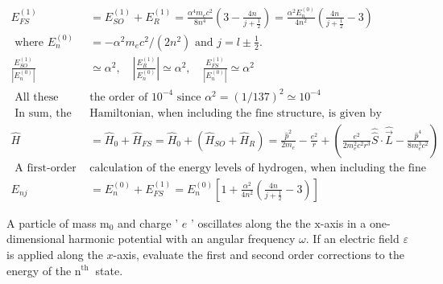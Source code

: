 	$$
	\begin{aligned}
	E_{F S}^{(1)}&=E_{S O}^{(1)}+E_{R}^{(1)}=\frac{\alpha^{4} m_{e} c^{2}}{8 n^{4}}\left(3-\frac{4 n}{j+\frac{1}{2}}\right)=\frac{\alpha^{2} E_{n}^{(0)}}{4 n^{2}}\left(\frac{4 n}{j+\frac{1}{2}}-3\right)\\
\text{	where }E_{n}^{(0)}&=-\alpha^{2} m_{e} c^{2} /\left(2 n^{2}\right)\text{ and $j=l \pm \frac{1}{2}$.}\\
	\frac{E_{S O}^{(1)}}{\left|E_{n}^{(0)}\right|}& \simeq \alpha^{2}, \quad\left|\frac{E_{R}^{(1)}}{E_{n}^{(0)}}\right| \simeq \alpha^{2}, \quad \frac{E_{F S}^{(1)}}{\left|E_{n}^{(0)}\right|} \simeq \alpha^{2}\\
\text{	All these terms are of }&\text{the order of $10^{-4}$ since $\alpha^{2}=(1 / 137)^{2} \simeq 10^{-4}$}\\
\text{	In sum, the hydrogen's }&\text{Hamiltonian, when including the fine structure, is given by}\\
	\hat{H}&=\hat{H}_{0}+\hat{H}_{F S}=\hat{H}_{0}+\left(\hat{H}_{S O}+\hat{H}_{R}\right)=\frac{\hat{p}^{2}}{2 m_{e}}-\frac{e^{2}}{r}+\left(\frac{e^{2}}{2 m_{e}^{2} c^{2} r^{3}} \hat{\hat{S}} \cdot \hat{\vec{L}}-\frac{\hat{p}^{4}}{8 m_{e}^{3} c^{2}}\right)\\
\text{	A first-order perturbation }&\text{calculation of the energy levels of hydrogen, when including the fine structure, yields}\\
	E_{n j}&=E_{n}^{(0)}+E_{F S}^{(1)}=E_{n}^{(0)}\left[1+\frac{\alpha^{2}}{4 n^{2}}\left(\frac{4 n}{j+\frac{1}{2}}-3\right)\right]
\end{aligned}
$$
\begin{exercise}
 A particle of mass $\mathrm{m}_{0}$ and charge ' $e$ ' oscillates along the the $\mathrm{x}$-axis in a one-dimensional harmonic potential with an angular frequency $\omega$. If an electric field $\varepsilon$ is applied along the $x$-axis, evaluate the first and second order corrections to the energy of the $\mathrm{n}^{\text {th }}$ state.
\end{exercise}
